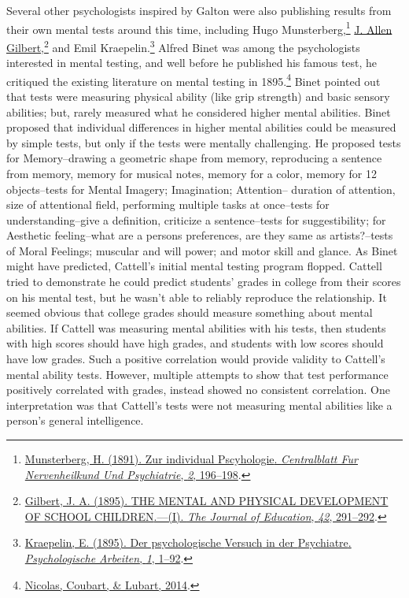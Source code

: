 \documentclass[
  oneside,
  12pt]{crumpbook}
\begin{document}
Several other psychologists inspired by Galton were also publishing results from their own mental tests around this time, including Hugo Munsterberg,\footnote{\protect\hyperlink{ref-munsterbergZurIndividualPscyhologie1891}{Munsterberg, H. (1891). Zur individual {Pscyhologie}. \emph{Centralblatt Fur Nervenheilkund Und Psychiatrie}, \emph{2}, 196--198}.} \href{https://www.nps.gov/articles/expressions-as-diverse-as-the-landscape-selling-building.htm}{J. Allen Gilbert},\footnote{\protect\hyperlink{ref-gilbertMENTALPHYSICALDEVELOPMENT1895}{Gilbert, J. A. (1895). {THE MENTAL AND PHYSICAL DEVELOPMENT OF SCHOOL CHILDREN}.---({I}). \emph{The Journal of Education}, \emph{42}, 291--292}.} and Emil Kraepelin.\footnote{\protect\hyperlink{ref-kraepelinPsychologischeVersuchPsychiatre1895}{Kraepelin, E. (1895). Der psychologische {Versuch} in der {Psychiatre}. \emph{Psychologische Arbeiten}, \emph{1}, 1--92}.} Alfred Binet was among the psychologists interested in mental testing, and well before he published his famous test, he critiqued the existing literature on mental testing in 1895.\footnote{\protect\hyperlink{ref-nicolasProgramIndividualPsychology2014}{Nicolas, Coubart, \& Lubart, 2014}.} Binet pointed out that tests were measuring physical ability (like grip strength) and basic sensory abilities; but, rarely measured what he considered higher mental abilities. Binet proposed that individual differences in higher mental abilities could be measured by simple tests, but only if the tests were mentally challenging. He proposed tests for Memory--drawing a geometric shape from memory, reproducing a sentence from memory, memory for musical notes, memory for a color, memory for 12 objects--tests for Mental Imagery; Imagination; Attention-- duration of attention, size of attentional field, performing multiple tasks at once--tests for understanding--give a definition, criticize a sentence--tests for suggestibility; for Aesthetic feeling--what are a persons preferences, are they same as artists?--tests of Moral Feelings; muscular and will power; and motor skill and glance.
As Binet might have predicted, Cattell's initial mental testing program flopped. Cattell tried to demonstrate he could predict students' grades in college from their scores on his mental test, but he wasn't able to reliably reproduce the relationship. It seemed obvious that college grades should measure something about mental abilities. If Cattell was measuring mental abilities with his tests, then students with high scores should have high grades, and students with low scores should have low grades. Such a positive correlation would provide validity to Cattell's mental ability tests. However, multiple attempts to show that test performance positively correlated with grades, instead showed no consistent correlation. One interpretation was that Cattell's tests were not measuring mental abilities like a person's general intelligence.
\end{document}
